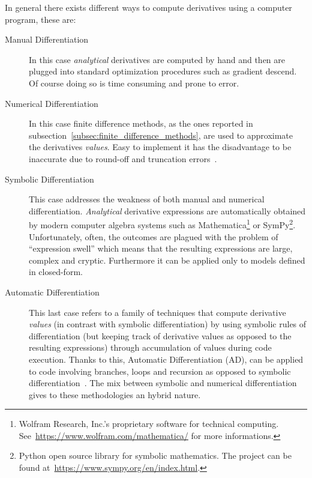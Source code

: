 In general there exists different ways to compute derivatives using a computer program, these are:
\begin{description}
	\item[Manual Differentiation] In this case \emph{analytical} derivatives are computed by hand and then are plugged into standard optimization procedures such as gradient descend. Of course doing so is time consuming and prone to error.
	
	\item[Numerical Differentiation] In this case finite difference methods, as the ones reported in subsection~\vref{subsec:finite_difference_methods}, are used to approximate the derivatives \emph{values}. Easy to implement it has the disadvantage to be inaccurate due to round-off and truncation errors~\cite{LeVeque:FD_book}.

	\item[Symbolic Differentiation] This case addresses the weakness of both manual and numerical differentiation. \emph{Analytical} derivative expressions are automatically obtained by modern computer algebra systems such as Mathematica\footnote{Wolfram Research, Inc.'s proprietary software for technical computing. See~\url{https://www.wolfram.com/mathematica/} for more informations.} or SymPy\footnote{Python open source library for symbolic mathematics. The project can be found at~\url{https://www.sympy.org/en/index.html}.}. Unfortunately, often, the outcomes are plagued with the problem of ``expression swell'' which means that the resulting expressions are large, complex and cryptic. Furthermore it can be applied only to models defined in closed-form.
	
	\item[Automatic Differentiation] This last case refers to a family of techniques that compute derivative \emph{values} (in contrast with symbolic differentiation) by using symbolic rules of differentiation (but keeping track of derivative values as opposed to the resulting expressions) through accumulation of values during code execution. Thanks to this, Automatic Differentiation (AD), can be applied to code involving branches, loops and recursion as opposed to symbolic differentiation~\cite{Baydin:AD_survey}. The mix between symbolic and numerical differentiation gives to these methodologies an hybrid nature.
\end{description}

